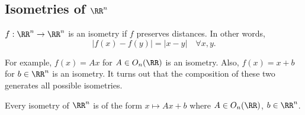 \subsection{Isometries of $\RR^n$}

\begin{definition}

$f: \RR^n\rightarrow \RR^n$ is an \ac{isometry} if $f$ preserves distances. In other words, 
\[\vert f(x)-f(y)\vert = \vert x-y\vert\quad \forall x,y.\]
\end{definition}

For example, $f(x) = Ax$ for $A\in O_n(\RR)$ is an isometry. Also, $f(x) = x+b$ for $b\in \RR^n$ is an isometry. It turns out that the composition of these two generates all possible isometries. 

\begin{theorem}
\thmlabel

Every isometry of $\RR^n$ is of the form $x\mapsto Ax+b$ where $A\in O_n(\RR)$, $b\in \RR^n$. 
\end{theorem}

